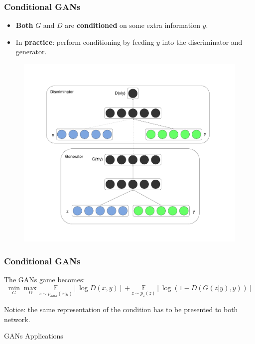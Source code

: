 \documentclass{beamer}
\begin{document}
\begin{frame}
	\frametitle{Conditional GANs}
	\begin{itemize}
		\item \textbf{Both} $G$ and $D$ are \textbf{conditioned} on some extra information $y$.
		\item In \textbf{practice}:  perform conditioning by feeding $y$ into the discriminator and generator.
	\end{itemize}
\vspace{-1cm}
\begin{figure}
	\includegraphics[height=0.9\textheight]{diagram.pdf}
\end{figure}
\end{frame}

\begin{frame}
	\frametitle{Conditional GANs}
The GANs game becomes:
	$$ 	\min_G \max_D \underset{x \sim p_{data}(x|y)}{\mathbb{E}} [\log D(x, y)]  +\underset{z \sim p_z(z)}{\mathbb{E}}[\log(1 - D(G(z|y), y))] $$
	
	\begin{block}{}
		Notice: the same representation of the condition has to be presented to both network.
	\end{block}
\end{frame}

\begin{frame}[standout]
GANs Applications
\end{frame}
\end{document}
